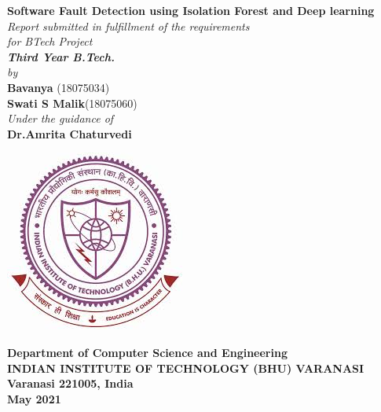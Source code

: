 \begin{titlepage}
\thispagestyle{empty}
\mbox{}
\begin{center}
\textbf{\Huge Software Fault Detection using Isolation Forest and Deep learning }
\textheight 15.5in \textwidth 12.5in \\[9ex]
\emph{Report submitted in fulfillment of the requirements\\
for BTech Project\\
[2ex]\large \bf Third Year B.Tech.
}\\
[2ex] \emph{by} \\[2ex]

\textbf{\large Bavanya }{(18075034)}\\[1ex]
\textbf {\large Swati S Malik}{(18075060)}\\ [5ex] 
\emph{Under the guidance of}\\[1ex]
\textbf{\large Dr.Amrita Chaturvedi} \\[7ex]


\vspace{.05in}
\begin{center}
 \includegraphics[scale=.7,keepaspectratio=true]{./logo.jpeg}
\end{center}
% 

\vspace{1cm}
{\small  \bf Department of Computer Science and Engineering}  \\[1ex]
{\small \bf{INDIAN INSTITUTE OF TECHNOLOGY (BHU) VARANASI \\
Varanasi 221005, India\\
  May 2021}}

\end{center}
\end{titlepage}

